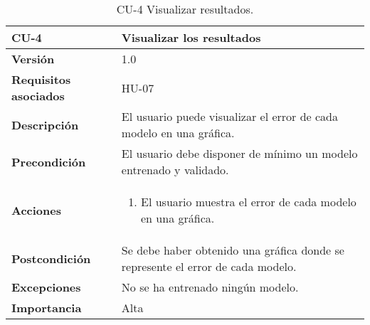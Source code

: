 \begin{table}[p]
	\centering
	\begin{tabularx}{\linewidth}{ p{} p{} }
		\toprule
		\textbf{CU-4}    & \textbf{Visualizar los resultados}\\
		\toprule
		\textbf{Versión}              & 1.0    \\
		\textbf{Requisitos asociados} & HU-07 \\
		\textbf{Descripción}          & El usuario puede visualizar el error de cada modelo en una gráfica.\\
		\textbf{Precondición}         & El usuario debe disponer de mínimo un modelo entrenado y validado.\\
		\textbf{Acciones}             &
		\begin{enumerate}
			\def\labelenumi{\arabic{enumi}.}
			\tightlist
			\item El usuario muestra el error de cada modelo en una gráfica.
		\end{enumerate}\\
		\textbf{Postcondición}        & Se debe haber obtenido una gráfica donde se represente el error de cada modelo. \\
		\textbf{Excepciones}          & No se ha entrenado ningún modelo.  \\
		\textbf{Importancia}          & Alta \\
		\bottomrule
	\end{tabularx}
	\caption{CU-4 Visualizar resultados.}
\end{table}
